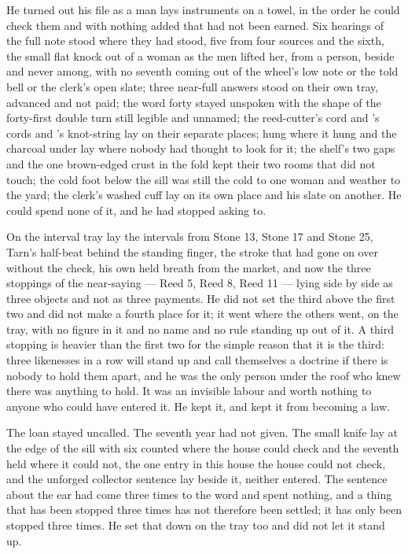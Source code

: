He turned out his file as a man lays instruments on a towel, in the order he could check them and with nothing added that had not been earned. Six hearings of the full note stood where they had stood, five from four sources and the sixth, the small flat knock out of a woman as the men lifted her, from a person, beside and never among, with no seventh coming out of the wheel's low note or the told bell or the clerk's open slate; three near-full answers stood on their own tray, advanced and not paid; the word forty stayed unspoken with the shape of the forty-first double turn still legible and unnamed; the reed-cutter's cord and 's cords and 's knot-string lay on their separate places;  hung where it hung and the charcoal under  lay where nobody had thought to look for it; the shelf's two gaps and the one brown-edged crust in the fold kept their two rooms that did not touch; the cold foot below the sill was still the cold to one woman and weather to the yard; the clerk's washed cuff lay on its own place and his slate on another. He could spend none of it, and he had stopped asking to.

On the interval tray lay the intervals from Stone 13, Stone 17 and Stone 25, Tarn's half-beat behind the standing finger, the stroke that had gone on over  without the check, his own held breath from the market, and now the three stoppings of the near-saying --- Reed 5, Reed 8, Reed 11 --- lying side by side as three objects and not as three payments. He did not set the third above the first two and did not make a fourth place for it; it went where the others went, on the tray, with no figure in it and no name and no rule standing up out of it. A third stopping is heavier than the first two for the simple reason that it is the third: three likenesses in a row will stand up and call themselves a doctrine if there is nobody to hold them apart, and he was the only person under the roof who knew there was anything to hold. It was an invisible labour and worth nothing to anyone who could have entered it. He kept it, and kept it from becoming a law.

The loan stayed uncalled. The seventh year had not given. The small knife lay at the edge of the sill with six counted where the house could check and the seventh held where it could not, the one entry in this house the house could not check, and the unforged collector sentence lay beside it, neither entered. The sentence about the ear had come three times to the word and spent nothing, and a thing that has been stopped three times has not therefore been settled; it has only been stopped three times. He set that down on the tray too and did not let it stand up.

